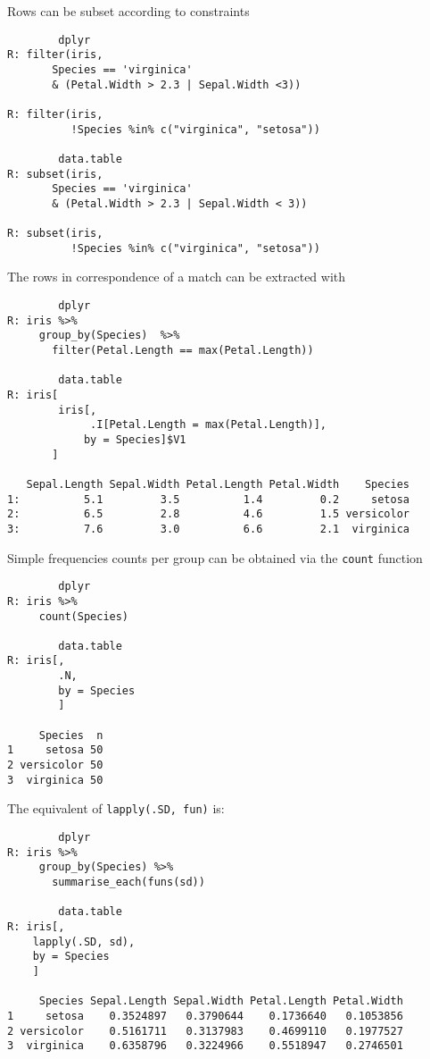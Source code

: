 Rows can be subset according to constraints
\begin{verbatim}
		dplyr
R: filter(iris, 
       Species == 'virginica'
       & (Petal.Width > 2.3 | Sepal.Width <3))

R: filter(iris,
          !Species %in% c("virginica", "setosa"))
       
		data.table
R: subset(iris, 
       Species == 'virginica'
       & (Petal.Width > 2.3 | Sepal.Width < 3)) 
       
R: subset(iris,
          !Species %in% c("virginica", "setosa"))       
\end{verbatim}
The rows in correspondence of a match
can be extracted with
\begin{verbatim}
		dplyr
R: iris %>% 
     group_by(Species)  %>% 
       filter(Petal.Length == max(Petal.Length))
       
		data.table
R: iris[
        iris[, 
             .I[Petal.Length = max(Petal.Length)], 
	        by = Species]$V1
       ]
	
   Sepal.Length Sepal.Width Petal.Length Petal.Width    Species
1:          5.1         3.5          1.4         0.2     setosa
2:          6.5         2.8          4.6         1.5 versicolor
3:          7.6         3.0          6.6         2.1  virginica
\end{verbatim}

Simple frequencies counts per group can be obtained 
via the \texttt{count} function
\begin{verbatim}
		dplyr
R: iris %>% 
     count(Species) 

		data.table
R: iris[, 
        .N,
        by = Species
        ]

     Species  n
1     setosa 50
2 versicolor 50
3  virginica 50
\end{verbatim}
The equivalent of \texttt{lapply(.SD, fun)} is:
\begin{verbatim}
		dplyr
R: iris %>%
     group_by(Species) %>%
       summarise_each(funs(sd))
 
		data.table
R: iris[,
	lapply(.SD, sd),
	by = Species
	]

     Species Sepal.Length Sepal.Width Petal.Length Petal.Width
1     setosa    0.3524897   0.3790644    0.1736640   0.1053856
2 versicolor    0.5161711   0.3137983    0.4699110   0.1977527
3  virginica    0.6358796   0.3224966    0.5518947   0.2746501
\end{verbatim}

